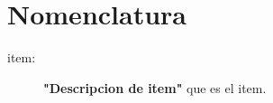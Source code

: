 \chapter{Nomenclatura}
\begin{description}
	\item [item:]  \textbf{"Descripcion de item"} que es el item.

	
\end{description}